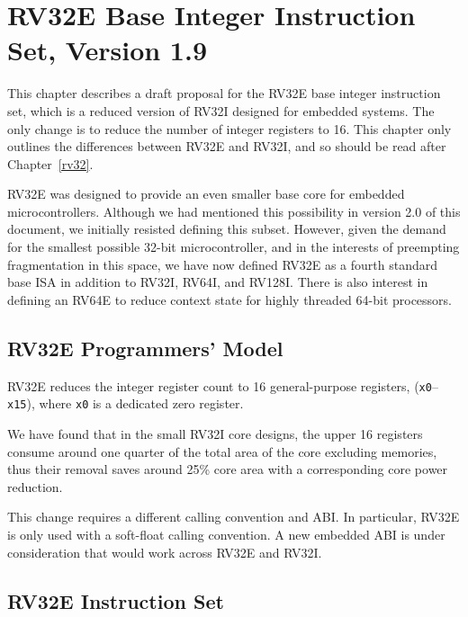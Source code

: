 \chapter{RV32E Base Integer Instruction Set, Version 1.9}
\label{rv32e}

This chapter describes a draft proposal for the RV32E base integer
instruction set, which is a reduced version of RV32I designed for
embedded systems.  The only change is to reduce the number of integer
registers to 16.  This chapter only outlines the differences between
RV32E and RV32I, and so should be read after Chapter~\ref{rv32}.

\begin{commentary}
RV32E was designed to provide an even smaller base core for embedded
microcontrollers.  Although we had mentioned this possibility in
version 2.0 of this document, we initially resisted defining this
subset. However, given the demand for the smallest possible 32-bit
microcontroller, and in the interests of preempting fragmentation in
this space, we have now defined RV32E as a fourth standard base ISA in
addition to RV32I, RV64I, and RV128I.  There is also interest in
defining an RV64E to reduce context state for highly threaded 64-bit
processors.
\end{commentary}

\section{RV32E Programmers' Model}

RV32E reduces the integer register count to 16 general-purpose
registers, ({\tt x0}--{\tt x15}), where {\tt x0} is a dedicated zero
register.

\begin{commentary}
We have found that in the small RV32I core designs, the upper 16
registers consume around one quarter of the total area of the core
excluding memories, thus their removal saves around 25\% core area
with a corresponding core power reduction.
\end{commentary}

\begin{commentary}
This change requires a different calling convention and ABI.  In
particular, RV32E is only used with a soft-float calling convention.
A new embedded ABI is under consideration that would work across RV32E
and RV32I.
\end{commentary}

\section{RV32E Instruction Set}

